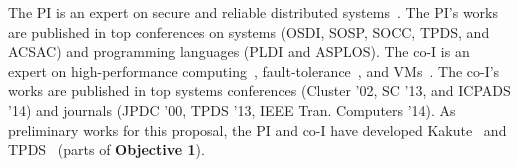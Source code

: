 The PI is an expert on secure and reliable distributed 
systems~\cite{smt:cacm, cui:tern:osdi10, peregrine:sosp11,
parrot:sosp13, crane:sosp15, tripod:apsys16, kakute:acsac17, 
confluence:tpds17}. The PI's works are published in top conferences on systems 
(OSDI, SOSP, SOCC, TPDS, and ACSAC) and programming languages (PLDI and ASPLOS). 
The co-I is an expert on high-performance 
computing~\cite{powerrock,hwang,jessica,cheung,khokhar}, fault-tolerance~\cite{ 
sheng,shengdi1}, and VMs~\cite{rhymes,shengdi,jessica2}. The 
co-I's works are published in top systems conferences (Cluster '02, SC '13, 
and ICPADS '14) and journals (JPDC '00, TPDS '13, IEEE Tran. Computers '14). As 
preliminary works for this proposal, the PI and co-I have developed 
Kakute~\cite{kakute:acsac17} and TPDS~\cite{confluence:tpds17} (parts of 
\textbf{Objective 1}). 


